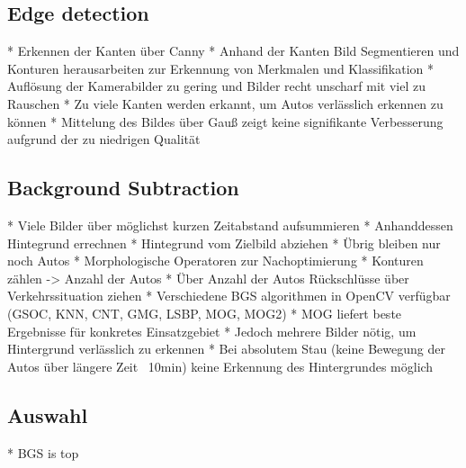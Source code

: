 \subsection{Edge detection}
* Erkennen der Kanten über Canny\newline
* Anhand der Kanten Bild Segmentieren und Konturen herausarbeiten zur Erkennung von Merkmalen und Klassifikation\newline
* Auflösung der Kamerabilder zu gering und Bilder recht unscharf mit viel zu Rauschen\newline
* Zu viele Kanten werden erkannt, um Autos verlässlich erkennen zu können\newline
* Mittelung des Bildes über Gauß zeigt keine signifikante Verbesserung aufgrund der zu niedrigen Qualität\newline
	
\subsection{Background Subtraction}
* Viele Bilder über möglichst kurzen Zeitabstand aufsummieren\newline
* Anhanddessen Hintegrund errechnen\newline
* Hintegrund vom Zielbild abziehen\newline
* Übrig bleiben nur noch Autos\newline
* Morphologische Operatoren zur Nachoptimierung\newline
* Konturen zählen -> Anzahl der Autos\newline
* Über Anzahl der Autos Rückschlüsse über Verkehrssituation ziehen\newline
* Verschiedene BGS algorithmen in OpenCV verfügbar (GSOC, KNN, CNT, GMG, LSBP, MOG, MOG2)\newline
* MOG liefert beste Ergebnisse für konkretes Einsatzgebiet\newline
* Jedoch mehrere Bilder nötig, um Hintergrund verlässlich zu erkennen\newline
* Bei absolutem Stau (keine Bewegung der Autos über längere Zeit ~10min) keine Erkennung des Hintergrundes möglich\newline

\subsection{Auswahl}
* BGS is top
